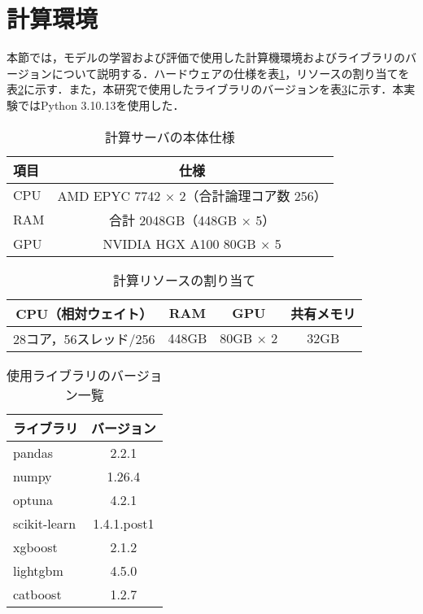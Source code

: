 \section{計算環境}
本節では，モデルの学習および評価で使用した計算機環境およびライブラリのバージョンについて説明する．ハードウェアの仕様を表\ref{tab:server_specs}，リソースの割り当てを表\ref{tab:resource_allocation}に示す．また，本研究で使用したライブラリのバージョンを表\ref{tab:versions}に示す．本実験ではPython 3.10.13を使用した．
\begin{table}[htbp]
    \centering
    \caption{計算サーバの本体仕様}
    \label{tab:server_specs}
    \begin{tabular}{l|c}
        \hline\hline\hline
        項目 & 仕様 \\
        \hline
        CPU  & AMD EPYC 7742 × 2（合計論理コア数 256） \\
        RAM  & 合計 2048GB（448GB × 5） \\
        GPU  & NVIDIA HGX A100 80GB × 5 \\
        \hline\hline\hline
    \end{tabular}
\end{table}

\begin{table}[htbp]
    \centering
    \caption{計算リソースの割り当て}
    \label{tab:resource_allocation}
    \begin{tabular}{c|c|c|c}
        \hline\hline\hline
        CPU（相対ウェイト） & RAM & GPU & 共有メモリ \\
        \hline
        28コア，56スレッド/256 & 448GB & 80GB × 2 & 32GB  \\
        \hline\hline\hline
    \end{tabular}
\end{table}

\begin{table}[htbp]
    \centering
    \caption{使用ライブラリのバージョン一覧}
    \label{tab:versions}
    \begin{tabular}{l|c}
        \hline\hline\hline
        ライブラリ & バージョン \\
        \hline
        pandas & 2.2.1 \\
        numpy & 1.26.4 \\
        optuna & 4.2.1 \\
        scikit-learn & 1.4.1.post1 \\
        xgboost & 2.1.2 \\
        lightgbm & 4.5.0 \\
        catboost & 1.2.7 \\
        \hline\hline\hline
    \end{tabular}
\end{table}

